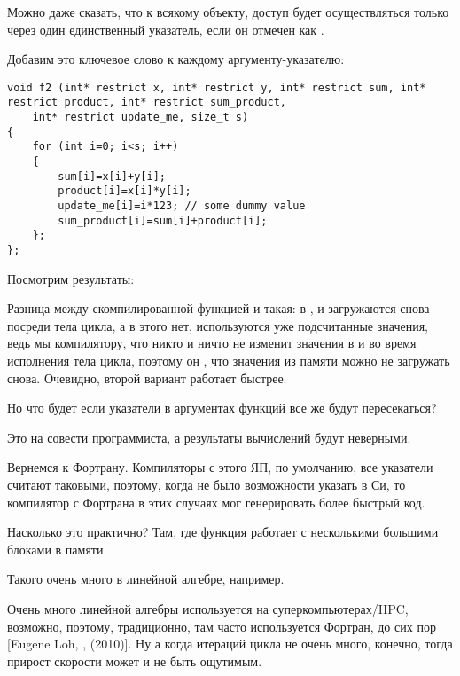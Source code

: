 Можно даже сказать, что к всякому объекту, доступ будет осуществляться только через
один единственный указатель, если он отмечен как .

Добавим это ключевое слово к каждому аргументу-указателю:

\begin{lstlisting}[style=customc]
void f2 (int* restrict x, int* restrict y, int* restrict sum, int* restrict product, int* restrict sum_product, 
	int* restrict update_me, size_t s)
{
	for (int i=0; i<s; i++)
	{
		sum[i]=x[i]+y[i];
		product[i]=x[i]*y[i];
		update_me[i]=i*123; // some dummy value
		sum_product[i]=sum[i]+product[i];	
	};
};
\end{lstlisting}

Посмотрим результаты:





Разница между скомпилированной функцией  и  такая:
в ,  и  загружаются снова посреди тела цикла,
а в  этого нет, используются уже подсчитанные значения, 
ведь мы  компилятору, 
что никто и ничто не изменит значения в  
и  во время исполнения тела цикла, 
поэтому он , что значения из памяти можно не загружать снова.
Очевидно, второй вариант работает быстрее.

Но что будет если указатели в аргументах функций все же будут пересекаться?

Это на совести программиста, а результаты вычислений будут неверными.

Вернемся к Фортрану. 
Компиляторы с этого ЯП, по умолчанию, все указатели считают таковыми,
поэтому, когда не было возможности указать  в Си, 
то компилятор с Фортрана в этих случаях мог генерировать более быстрый код.

Насколько это практично? 
Там, где функция работает с несколькими большими блоками в памяти.

Такого очень много в линейной алгебре, например.

Очень много линейной алгебры используется на суперкомпьютерах/\ac{HPC},
возможно, поэтому, традиционно, там часто используется Фортран, до сих пор
[Eugene Loh, , (2010)].
Ну а когда итераций цикла не очень много, конечно, 
тогда прирост скорости может и не быть ощутимым.

